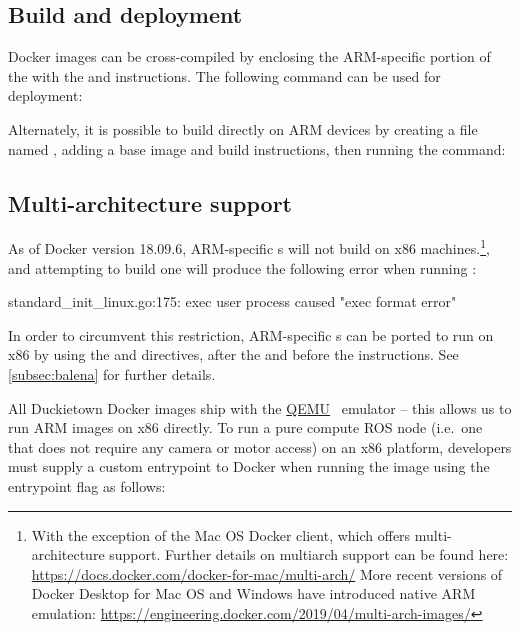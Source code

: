 \subsection{Build and deployment}

Docker images can be cross-compiled by enclosing the ARM-specific portion of the  with the  and  instructions. The following command can be used for deployment:

%
Alternately, it is possible to build directly on ARM devices by creating a file named , adding a base image and build instructions, then running the command:

%
\subsection{Multi-architecture support}

As of Docker version 18.09.6, ARM-specific s will not build on x86 machines.\hspace{-.08em}\footnote{With the exception of the Mac OS Docker client, which offers multi-architecture support. Further details on multiarch support can be found here: \url{https://docs.docker.com/docker-for-mac/multi-arch/} More recent versions of Docker Desktop for Mac OS and Windows have introduced native ARM emulation: \url{https://engineering.docker.com/2019/04/multi-arch-images/}}, and attempting to build one will produce the following error when running :

\begin{pclisting}
standard_init_linux.go:175: exec user process caused "exec format error"
\end{pclisting}
%
In order to circumvent this restriction, ARM-specific s can be ported to run on x86 by using the  and  directives, after the  and before the  instructions. See \autoref{subsec:balena} for further details.

All Duckietown Docker images ship with the \href{https://www.qemu.org}{QEMU}~\citep{bellard2005qemu} emulator -- this allows us to run ARM images on x86 directly. To run a pure compute ROS node (i.e.\ one that does not require any camera or motor access) on an x86 platform, developers must supply a custom entrypoint to Docker when running the image using the entrypoint flag as follows:

